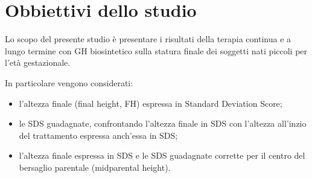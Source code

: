  





\section{Obbiettivi dello studio}

Lo scopo del presente studio è presentare i risultati della terapia continua e a lungo termine  con GH biosintetico sulla statura finale dei soggetti nati piccoli per l'età gestazionale.

In particolare vengono considerati:

\begin{itemize}
\item l'altezza finale (final height, FH) espressa in Standard Deviation Score;
\item le SDS guadagnate, confrontando l'altezza finale in SDS con l'altezza all'inzio del trattamento espressa anch'essa in SDS;
\item l'altezza finale espressa in SDS e le SDS guadagnate corrette per il centro del bersaglio parentale (midparental height).
\end{itemize}



